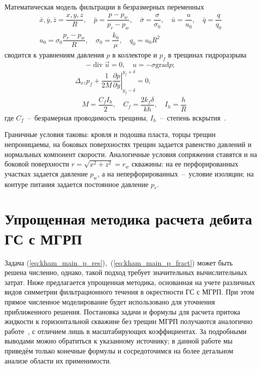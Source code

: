 \documentclass{article}
\begin{document}
Математическая модель фильтрации в безразмерных переменных
\begin{equation*}
	\displaystyle
	\begin{gathered}
		\bar{x},\bar{y},\bar{z} = \dfrac{x,y,z}{R}, \quad
		\bar{p} = \dfrac{p - p_w}{p_r - p_w}, \quad
		\bar{\sigma} = \dfrac{\sigma}{\sigma_0}, \quad
		\bar{u}=\dfrac{u}{u_0},  \quad
		\bar{q} = \dfrac{q}{q_0}    \\
		u_0 = \sigma_0 \dfrac{p_r - p_w}{R}, \quad
		\sigma_0 = \dfrac{k_0}{\mu}, \quad
		q_0 = u_0 R^2
	\end{gathered}
\end{equation*}
сводится  к уравнениям  давления $p$ в коллекторе и $p_f$ в трещинах
гидроразрыва~\cite{lit:kham_mazo_uzku_2015}
\begin{equation}
	\displaystyle
	- \operatorname{div} \vec{u} = 0, \quad u=-\sigma \text{grad} p;
	\label{eq:kham_main_p_res}
\end{equation}
\begin{equation}
	\displaystyle
	\begin{gathered}
		\Delta_{xz} p_f + \dfrac{1}{2M}\left.\dfrac{\partial p}{\partial y} \right|_{y_f - \delta}^{y_f + \delta} = 0, \\[8pt]
		\quad M = \dfrac{C_f I_h}{2}, \quad C_f = \dfrac{2 k_f \delta}{k h}, \quad I_h=\dfrac{h}{R}
	\end{gathered}
	\label{eq:kham_main_p_fract}
\end{equation}
где $C_f$~--~безрамерная проводимость трещины, $I_h$~--~степень
вскрытия~\cite{lit:kham_valko_economides_2001}.

Граничные условия таковы: кровля и подошва пласта, торцы трещин
непроницаемы, на боковых поверхностях трещин задается равенство давлений и
нормальных компонент скорости. Аналогичные условия сопряжения ставятся и на
боковой поверхности $r=\sqrt{x^2 + z^2} = r_w$ скважины: на ее перфорированных
участках задается давление $p_w$, а на неперфорированных~--~условие изоляции;
на контуре питания задается постоянное давление $p_r$.

\section{Упрощенная методика расчета дебита ГС с МГРП}

Задача (\ref{eq:kham_main_p_res}),~(\ref{eq:kham_main_p_fract}) может быть
решена численно, однако, такой подход требует значительных вычислительных затрат.
Ниже предлагается упрощенная методика, основанная на учете различных видов симметрии
фильтрационного течения в окрестности ГС с МГРП. При этом прямое численное моделирование
будет использовано для уточнения приближенного решения.
Постановка задачи и формулы для расчета притока жидкости к горизонтальной
скважине без трещин МГРП получаются аналогично работе~\cite{lit:kham_mazo_uzku_2015},
с отличием лишь в масштабирующих коэффициентах. За подробными выводами можно
обратиться к указанному источнику;
в данной работе мы приведём только конечные формулы и сосредоточимся
на более детальном анализе области их применимости.
\end{document}
